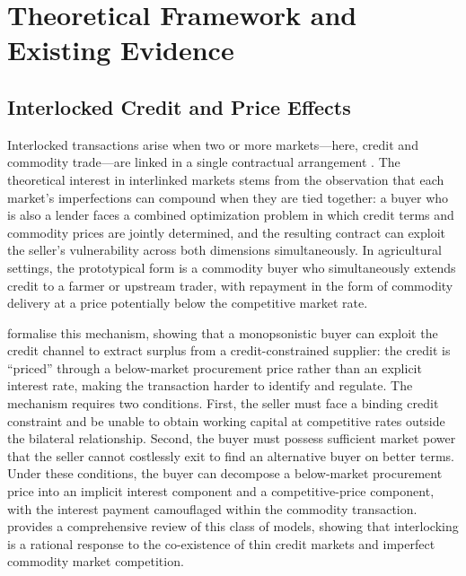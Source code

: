 \documentclass[authoryear,preprint,review,12pt]{elsarticle}
\begin{document}
\section{Theoretical Framework and Existing Evidence}
\label{sec:theory}

\subsection{Interlocked Credit and Price Effects}

Interlocked transactions arise when two or more markets---here, credit and
commodity trade---are linked in a single contractual arrangement
\citep{bardhan1980}. The theoretical interest in interlinked markets stems
from the observation that each market's imperfections can compound when they
are tied together: a buyer who is also a lender faces a combined optimization
problem in which credit terms and commodity prices are jointly determined, and
the resulting contract can exploit the seller's vulnerability across both
dimensions simultaneously. In agricultural settings, the prototypical form
is a commodity buyer who simultaneously extends credit to a farmer or upstream
trader, with repayment in the form of commodity delivery at a price potentially
below the competitive market rate.

\citet{braverman_stiglitz1982} formalise this mechanism, showing that a
monopsonistic buyer can exploit the credit channel to extract surplus from a
credit-constrained supplier: the credit is ``priced'' through a below-market
procurement price rather than an explicit interest rate, making the transaction
harder to identify and regulate. The mechanism requires two conditions. First,
the seller must face a binding credit constraint and be unable to obtain
working capital at competitive rates outside the bilateral relationship.
Second, the buyer must possess sufficient market power that the seller cannot
costlessly exit to find an alternative buyer on better terms. Under these
conditions, the buyer can decompose a below-market procurement price into an
implicit interest component and a competitive-price component, with the
interest payment camouflaged within the commodity transaction. \citet{bell1988}
provides a comprehensive review of this class of models, showing that
interlocking is a rational response to the co-existence of thin credit markets
and imperfect commodity market competition.
\end{document}
